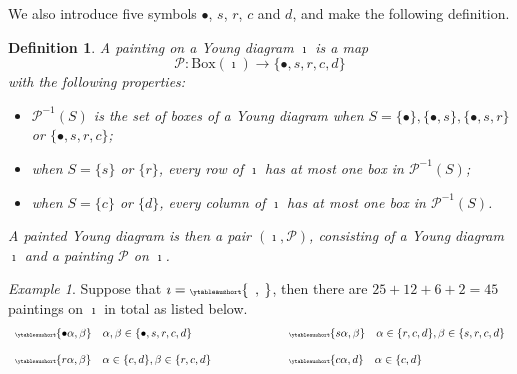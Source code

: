 \documentclass[12pt,a4paper]{amsart}
\newcommand{\CP}{{\mathcal {P}}}
\numberwithin{equation}{section}
\newtheorem{defn}[thm]{Definition}
\theoremstyle{remark}
\newtheorem*{Example}{Example}
\let\ytb=\ytableaushort
\newcommand{\tytb}[1]{{\tiny\ytb{#1}}}
\begin{document}
We also introduce five symbols $\bullet$, $s$, $r$, $c$ and $d$, and make the following definition.
\begin{defn}
A painting on a Young diagram $\imath$ is a map
\[
  \CP: \mathrm{Box}(\imath) \rightarrow \{\bullet, s, r, c, d \}
\]
with the following properties:
\begin{itemize}
\item
 $\CP^{-1}(S)$ is the set of boxes of a Young diagram when $S=\{\bullet\}, \{\bullet, s \}, \{\bullet, s, r\}$ or $\{\bullet, s, r, c \} $;
 \item
 when $S=\{s\}$ or $ \{r\}$, every row of $\imath$ has at most one  box in $\CP^{-1}(S)$;
   \item
 when $S=\{c\}$ or $ \{d \}$, every column of $\imath$ has at most one  box in $\CP^{-1}(S)$.
 \end{itemize}
A painted Young diagram is then a pair $(\imath, \CP)$, consisting of a Young diagram $\imath$ and a painting $\CP$ on $\imath$.

\end{defn}


\begin{Example} Suppose that $\imath=\tytb{\ \ ,\  }$, then there are $25+12+6+2=45$ paintings on $\imath$ in total as listed below.
\begin{equation*}\label{eq:sp-nsp.C}
\begin{array}{ll}
   \tytb{\bullet \alpha ,\beta } \quad \alpha, \beta\in \{\bullet, s,r,c,d\} \qquad \qquad  \qquad  & \tytb{s \alpha ,\beta } \quad \alpha\in \{r,c,d\}, \beta\in \{s,r,c,d\} \medskip \medskip \\
     \tytb{r \alpha ,\beta } \quad \alpha\in \{c,d\}, \beta\in \{r,c,d\} \qquad \qquad  \qquad
   &  \tytb{c \alpha , d } \quad  \alpha\in \{c,d\}
     \end{array}
  \end{equation*}

  \end{Example}
\end{document}
